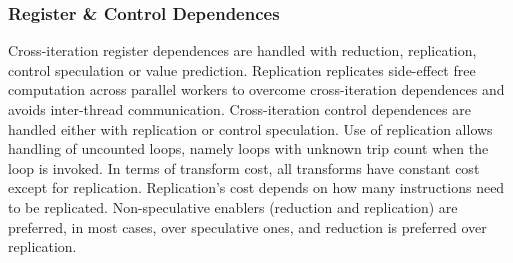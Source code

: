 %




\subsubsection{Register \& Control Dependences}

Cross-iteration register dependences
are handled with reduction, replication, control speculation or value
prediction. Replication replicates side-effect free computation across
parallel workers to overcome cross-iteration dependences and avoids
inter-thread communication.
%
Cross-iteration control dependences are handled either with
replication or control speculation.
Use of replication allows handling of uncounted loops, namely loops
with unknown trip count when the loop is invoked.
%
In terms of transform cost, all transforms have constant
cost except for replication.  Replication's cost depends on how many
instructions need to be replicated. Non-speculative enablers
(reduction and replication) are preferred, in most cases, over
speculative ones, and reduction is preferred over replication.

